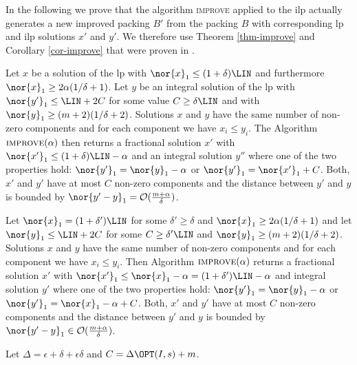 In the following we prove that the algorithm \textsc{improve} applied to the \BP \ac{ilp} actually generates a new improved packing $B'$ from the packing $B$ with corresponding \ac{lp} and \ac{ilp} solutions $x'$ and $y'$. We therefore use Theorem \ref{thm-improve} and Corollary \ref{cor-improve} that were proven in \cite{jansen2013binpacking}.

\begin{theorem}\label{thm-improve}
    Let $x$ be a solution of the \ac{lp} with $\nor{x}_1 \leq (1+\delta)
    \LIN$ and furthermore $\nor{x}_1 \geq 
	2 \alpha (1/ \delta +1)$. Let $y$ be an integral
	 solution of the \ac{lp} with  $\nor{y'}_1 \leq \LIN +2C$ for some value $C \geq \delta \LIN$
	 and with $\nor{y}_1 \geq (m+2)(1/\delta +2)$.
	 Solutions $x$ and $y$ have the same number of non-zero components and for each component we have 
	 $x_i \leq y_i$.
	The Algorithm $\textsc{improve}(\alpha)$ then returns a fractional solution $x'$ with $\nor{x'}_1 \leq (1+ \delta)\LIN -\alpha$ and an integral solution
	$y''$ where one of the two properties hold:
	 $\nor{y'}_1 = \nor{y}_1 - \alpha$ or $\nor{y'}_1 = \nor{x'}_1 + C$. 
	 Both, $x'$ and $y'$ have at most $C$
	non-zero components and the distance between $y'$ and $y$ is bounded by $\nor{y'-y}_1 
	= \mathcal{O}(\frac{m + \alpha}{\delta})$.
\end{theorem}
\begin{corollary}\label{cor-improve}
    Let $\nor{x}_1 = (1+ \delta')\LIN$ for some $\delta' \geq \delta$ and $\nor{x}_1 \geq 2 \alpha (1/ \delta +1)$
	and let $\nor{y}_1 \leq \LIN + 2C$ for some $C \geq \delta'\LIN$ and $\nor{y}_1 \geq (m+2)(1/\delta +2)$. 
	Solutions $x$ and $y$ have the same number of non-zero components and for each component we have 
	 $x_i \leq y_i$.
	 Then Algorithm $\textsc{improve}(\alpha)$ returns a fractional solution
	$x'$ with $\nor{x'}_1 \leq \nor{x}_1 - \alpha = (1+ \delta')\LIN - \alpha$ and integral solution $y'$ where one of the two properties hold:
	 $\nor{y'}_1 = \nor{y}_1 - \alpha$ or $\nor{y'}_1 = \nor{x}_1 - \alpha + C$. 
	Both, $x'$ and $y'$ have at most $C$
	non-zero components and the distance between $y'$ and $y$ is bounded by $\nor{y'-y}_1 
	\in \mathcal{O}(\frac{m + \alpha}{\delta})$.
\end{corollary}
Let $\Delta = \epsilon + \delta + \epsilon \delta$ and $C = \Delta \OPT(I,s) + m$.

